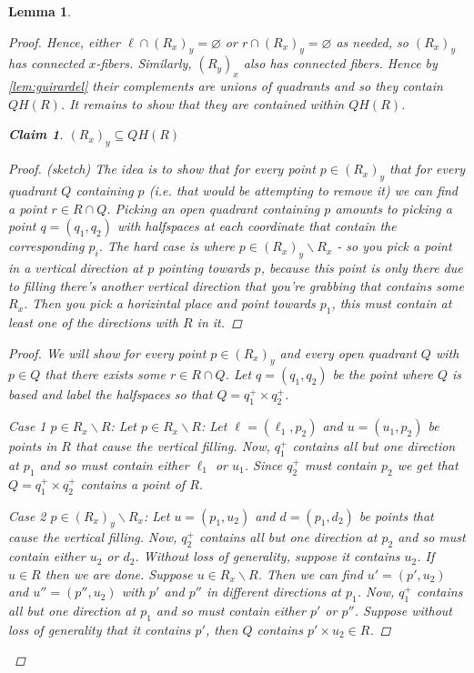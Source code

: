 \documentclass{article}
\newcommand{\rxy}{(R_x)_y}
\newcommand{\ryx}{(R_y)_x}
\theoremstyle{mystyle}
\newtheorem{lem}[thm]{Lemma}
\newtheorem*{claim*}{Claim}
\theoremstyle{remark}
\begin{document}
\begin{lem}
\begin{proof}
                Hence, either \(\ell \cap \rxy = \varnothing\) or \(r \cap \rxy = \varnothing\) as needed, so \(\rxy\) has connected \(x\)-fibers. Similarly, \(\ryx\) also has connected fibers. Hence by \ref{lem:guirardel} their complements are unions of quadrants and so they contain \(QH(R)\). It remains to show that they are contained within \(QH(R)\). 

                \begin{claim*}
                    \(\rxy \subseteq QH(R)\) 
                    \begin{proof}
                        (sketch) The idea is to show that for every point \(p \in \rxy\) that for every quadrant \(Q\) containing \(p\) (i.e. that would be attempting to remove it) we can find a point \(r \in R \cap Q\). Picking an open quadrant containing \(p\) amounts to picking a point \(q = (q_{1}, q_2)\) with halfspaces at each coordinate that contain the corresponding \(p_{i}\). The hard case is where \(p \in \rxy \smallsetminus R_x\) - so you pick a point in a vertical direction at \(p\) pointing towards \(p\), because this point is only there due to filling there's another vertical direction that you're grabbing that contains some \(R_x\). Then you pick a horizintal place and point towards \(p_1\), this must contain at least one of the directions with \(R\) in it.
                    \end{proof}

                    \begin{proof}
                        We will show for every point \(p \in \rxy\) and every open quadrant \(Q\) with \(p \in Q\) that there exists some \(r \in R \cap Q\). Let \(q=(q_1,q_2)\) be the point where \(Q\) is based and label the halfspaces so that \(Q=q_1^{+} \times q_{2}^{+}\).

                        Case 1 \(p \in R_x \smallsetminus R\): Let \(p \in R_x \smallsetminus R\): Let \(\ell = (\ell_1,p_2)\) and \(u=(u_1,p_2)\) be points in \(R\) that cause the vertical filling. Now, \(q_1^+\) contains all but one direction at \(p_1\) and so must contain either \(\ell_1\) or \(u_1\). Since \(q_2^+\) must contain \(p_2\) we get that \(Q=q_1^+ \times q_2^+\) contains a point of \(R\).


                        Case 2 \(p \in \rxy \smallsetminus R_x\): Let \(u=(p_1,u_2)\) and \(d=(p_1,d_2)\) be points that cause the vertical filling. Now, \(q_2^+\) contains all but one direction at \(p_2\) and so must contain either \(u_2\) or \(d_2\). Without loss of generality, suppose it contains \(u_2\). If \(u \in R\) then we are done. Suppose \(u \in R_x \smallsetminus R\). Then we can find \(u'=(p',u_2)\) and \(u''=(p'',u_2)\) with \(p'\) and \(p''\) in different directions at \(p_1\). Now, \(q_1^+\) contains all but one direction at \(p_1\) and so must contain either \(p'\) or \(p''\). Suppose without loss of generality that it contains \(p'\), then \(Q\) contains \(p' \times u_2 \in R\).
                    \end{proof}
                \end{claim*}



\end{proof}
\end{lem}
\end{document}
